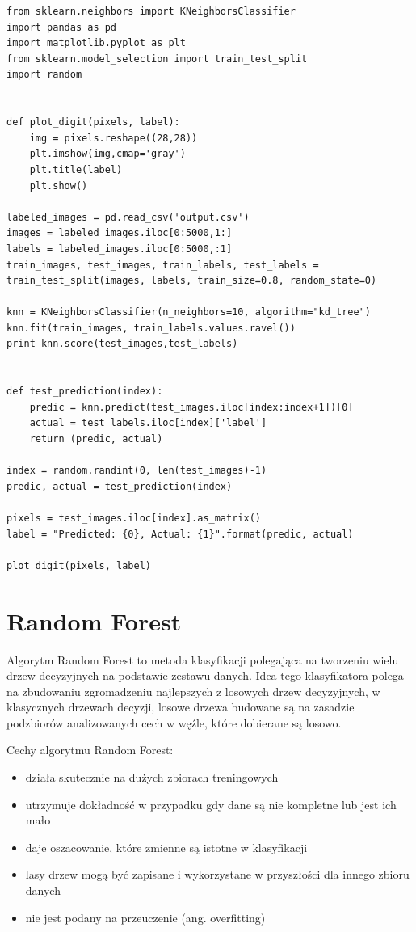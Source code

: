 \documentclass[brudnopis]{xmgr}
\begin{document}
\lstset{language=Python} 
\begin{lstlisting}
from sklearn.neighbors import KNeighborsClassifier
import pandas as pd
import matplotlib.pyplot as plt
from sklearn.model_selection import train_test_split
import random


def plot_digit(pixels, label):
    img = pixels.reshape((28,28))
    plt.imshow(img,cmap='gray')
    plt.title(label)
    plt.show()

labeled_images = pd.read_csv('output.csv')
images = labeled_images.iloc[0:5000,1:]
labels = labeled_images.iloc[0:5000,:1]
train_images, test_images, train_labels, test_labels = train_test_split(images, labels, train_size=0.8, random_state=0)

knn = KNeighborsClassifier(n_neighbors=10, algorithm="kd_tree")
knn.fit(train_images, train_labels.values.ravel())
print knn.score(test_images,test_labels)


def test_prediction(index):
    predic = knn.predict(test_images.iloc[index:index+1])[0]
    actual = test_labels.iloc[index]['label']
    return (predic, actual)

index = random.randint(0, len(test_images)-1)
predic, actual = test_prediction(index)

pixels = test_images.iloc[index].as_matrix()
label = "Predicted: {0}, Actual: {1}".format(predic, actual)

plot_digit(pixels, label)
\end{lstlisting}

\section{Random Forest}

Algorytm Random Forest to metoda klasyfikacji polegająca na tworzeniu wielu drzew decyzyjnych na podstawie zestawu danych. Idea tego klasyfikatora polega na zbudowaniu zgromadzeniu najlepszych z losowych drzew decyzyjnych, w klasycznych drzewach decyzji, losowe drzewa budowane są na zasadzie podzbiorów analizowanych cech w węźle, które dobierane są losowo.

Cechy algorytmu Random Forest:
\begin{itemize}
\item
działa skutecznie na dużych zbiorach treningowych
\item
utrzymuje dokładność w przypadku gdy dane są nie kompletne lub jest ich mało
\item
daje oszacowanie, które zmienne są istotne w klasyfikacji
\item
lasy drzew mogą być zapisane i wykorzystane w przyszłości dla innego zbioru danych
\item
nie jest podany na przeuczenie (ang. overfitting)
\end{itemize}
\end{document}
